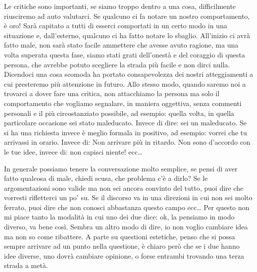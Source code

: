 \documentclass[12pt]{book} %
\begin{document}
Le critiche sono importanti, se siamo troppo dentro a una cosa, difficilmente riusciremo ad auto valutarci. 
Se qualcuno ci fa notare un nostro comportamento, è oro! Sarà capitato a tutti di esserci comportati
in un certo modo in una situazione e, dall'esterno, qualcuno ci ha fatto notare lo sbaglio.
All'inizio ci avrà fatto male, non sarà stato facile ammettere che avesse avuto ragione, ma una
volta superata questa fase, siamo stati grati dell'onestà e del coraggio di questa persona, che avrebbe potuto scegliere la strada più facile e non dirci nulla.
Dicendoci una cosa scomoda ha portato consapevolezza dei nostri atteggiamenti a cui presteremo più attenzione in
futuro. Allo stesso modo, quando saremo noi a trovarci a dover fare una critica, non attacchiamo la persona ma solo il
comportamento che vogliamo segnalare, in maniera oggettiva, senza commenti personali e il più circostanziato possibile,
ad esempio: quella volta, in quella particolare occasione sei stato maleducato. Invece di dire: sei un maleducato. Se
si ha una richiesta invece è meglio formala in positivo, ad esempio: vorrei che tu arrivassi in orario. Invece di: Non
arrivare più in ritardo. Non sono d'accordo con le tue idee, invece di: non capisci niente! ecc…

In generale possiamo tenere la conversazione molto semplice, se pensi di aver fatto qualcosa di male, chiedi scusa, che problema c'è a dirlo? Se le argomentazioni sono valide ma non sei ancora convinto del tutto, puoi dire che vorresti rifletterci un po' su. Se il discorso va in una direzioni in cui non sei molto ferrato, puoi dire che non conosci abbastanza questo campo ecc…
Per questo non mi piace tanto la modalità in cui uno dei due dice: ok, la pensiamo in modo diverso, va bene così. Sembra un altro modo di dire, io non voglio cambiare idea ma non so come ribattere. A parte su questioni estetiche, penso che si possa sempre arrivare ad un punto nella questione, è chiaro però che se i due hanno idee diverse, uno dovrà cambiare opinione, o forse entrambi trovando una terza strada a metà.
\end{document}
